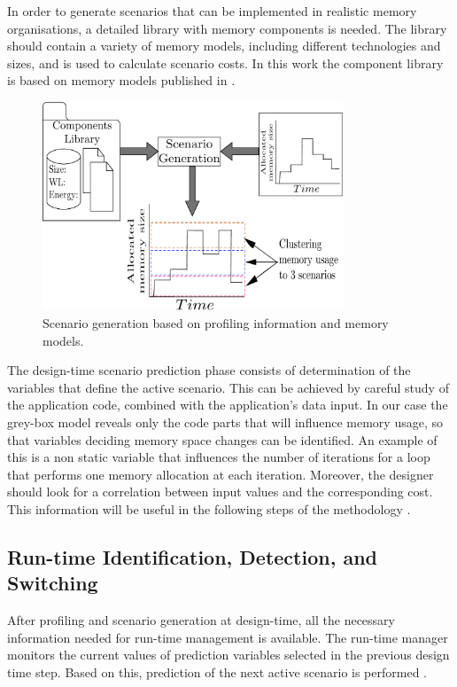 In order to generate scenarios that can be implemented in realistic memory organisations, a detailed library with memory components is needed. The library should contain a variety of memory models, including different technologies and sizes, and is used to calculate scenario costs. In this work the component library is based on memory models published in \cite{Artes2011}.

\begin{figure}[!t]
\centering
\includegraphics[width=0.8\textwidth]{A/clustering_v2-eps-converted-to.pdf}
\caption{Scenario generation based on profiling information and memory models.}
\label{fig:clusteringA}
\end{figure}

The design-time scenario prediction phase consists of determination of the variables that define the active scenario. This can be achieved by careful study of the application code, combined with the application's data input. In our case the grey-box model reveals only the code parts that will influence memory usage, so that variables deciding memory space changes can be identified. An example of this is a non static variable that influences the number of iterations for a loop that performs one memory allocation at each iteration. Moreover, the designer should look for a correlation between input values and the corresponding cost. This information will be useful in the following steps of the methodology \cite{tcm}.

\subsection{Run-time Identification, Detection, and Switching}

After profiling and scenario generation at design-time, all the necessary information needed for run-time management is available. The run-time manager monitors the current values of prediction variables selected in the previous design time step. Based on this, prediction of the next active scenario is performed  \cite{tcm}. 

